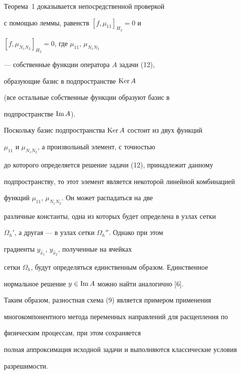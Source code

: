 Теорема~1 доказывается непосредственной проверкой


с помощью леммы, равенств $[f,\mu_{11}]_{H_2}{=}0$ и


$[f,\mu_{N_1N_2}]_{H_2}=0$, где $\mu_{11}$, $\mu_{N_1N_2}$


--- собственные функции оператора $A$ задачи (12),


образующие базис в подпространстве $\operatorname{Ker} A$


(все остальные собственные функции образуют базис в


подпространстве $\operatorname{Im} A$).





Поскольку базис подпространства $\operatorname{Ker} A$ состоит из двух функций


$\mu_{11}$ и $\mu_{N_1N_2}$, а произвольный элемент, с точностью


до которого определяется решение задачи (12), принадлежит данному


подпространству, то этот элемент является некоторой линейной комбинацией


функций $\mu_{11}$, $\mu_{N_1N_2}$. Он может распадаться на две


различные константы, одна из которых будет определена в узлах сетки


$\Omega_h'$, а другая --- в узлах сетки $\Omega_h''$. Однако при этом


градиенты $y_{\hat x_1}$, $y_{\hat x_2}$, полученные на ячейках


сетки $\Omega_h$, будут определяться единственным образом. Единственное


нормальное решение $y\in\operatorname{Im} A$ можно найти аналогично [6].





Таким образом, разностная схема (9) является примером применения


многокомпонентного метода переменных направлений для расщепления по


физическим процессам, при этом сохраняется


полная аппроксимация исходной задачи и выполняются классические условия


разрешимости.





